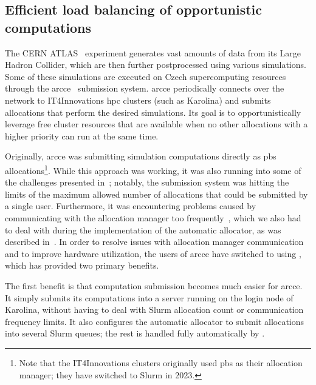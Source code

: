 \subsection{Efficient load balancing of opportunistic computations}
The CERN ATLAS~\cite{atlas} experiment generates vast amounts of data from its Large
Hadron Collider, which are then further postprocessed using various simulations. Some of these
simulations are executed on Czech supercomputing resources through the
\gls{arcce}~\cite{atlas-it4i-1} submission system. \gls{arcce}
periodically connects over the network to IT4Innovations \gls{hpc} clusters (such as
Karolina) and submits allocations that perform the desired simulations. Its goal is to
opportunistically leverage free cluster resources that are available when no other allocations with
a higher priority can run at the same time.

Originally, \gls{arcce} was submitting simulation computations directly as
\gls{pbs} allocations\footnote{Note that the IT4Innovations clusters originally used \gls{pbs} as their allocation
manager; they have switched to Slurm in 2023.}. While this approach was working, it was
also running into some of the challenges presented in~; notably, the
submission system was hitting the limits of the maximum allowed number of allocations that could be
submitted by a single user. Furthermore, it was encountering problems caused by communicating with
the allocation manager too frequently~\cite{atlas-it4i-2}, which we also had to deal with
during the implementation of the \hyperqueue{} automatic allocator, as was described
in~. In order to resolve issues with allocation manager communication and to
improve hardware utilization, the users of \gls{arcce} have switched to using
\hyperqueue{}, which has provided two primary benefits.

The first benefit is that computation submission becomes much easier for \gls{arcce}.
It simply submits its computations into a \hyperqueue{} server running on the login node
of Karolina, without having to deal with Slurm allocation count or communication frequency limits.
It also configures the automatic allocator to submit allocations into several Slurm queues; the
rest is handled fully automatically by \hyperqueue{}.

